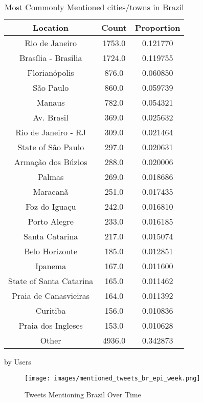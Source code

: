 \begin{table}
\begin{subtable}[c]{0.5\textwidth}
\centering
\begin{tabular}{|c|c|c|}
\hline
    \textbf{Location} & \textbf{Count} & \textbf{Proportion} \\
    \hline
    Rio de Janeiro & 1753.0 & 0.121770 \\
    Brasília - Brasilia & 1724.0 & 0.119755 \\
    Florianópolis & 876.0 & 0.060850 \\
    São Paulo & 860.0 & 0.059739 \\
    Manaus & 782.0 & 0.054321 \\
    Av. Brasil & 369.0 & 0.025632 \\
    Rio de Janeiro - RJ & 309.0 & 0.021464 \\
    State of São Paulo & 297.0 & 0.020631 \\
    Armação dos Búzios & 288.0 & 0.020006 \\
    Palmas & 269.0 & 0.018686 \\
    Maracanã & 251.0 & 0.017435 \\
    Foz do Iguaçu & 242.0 & 0.016810 \\
    Porto Alegre & 233.0 & 0.016185 \\
    Santa Catarina & 217.0 & 0.015074 \\
    Belo Horizonte & 185.0 & 0.012851 \\
    Ipanema & 167.0 & 0.011600 \\
    State of Santa Catarina & 165.0 & 0.011462 \\
    Praia de Canasvieiras & 164.0 & 0.011392 \\
    Curitiba & 156.0 & 0.010836 \\
    Praia dos Ingleses & 153.0 & 0.010628 \\
    Other & 4936.0 & 0.342873 \\
    \hline
    \end{tabular}
\caption{by Users}
\end{subtable}
\caption{Most Commonly Mentioned cities/towns in Brazil}
\label{table:mentioned-brazil}
\end{table}

\begin{figure}[H]
    \centering
    \texttt{[image: images/mentioned\_tweets\_br\_epi\_week.png]}
    
    \caption{Tweets Mentioning Brazil Over Time}
    \label{fig:mentioned-tweets-br-epi-week}
\end{figure}

